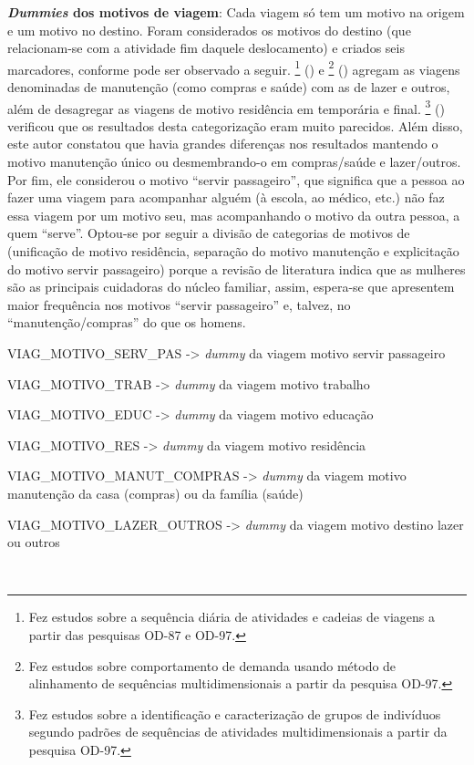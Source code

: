 \begin{compactitem}
\item \textbf{\textit{Dummies} dos motivos de viagem}: Cada viagem só tem um motivo na origem e um motivo no destino.
Foram considerados os motivos do destino (que relacionam-se com a atividade fim daquele deslocamento) e criados seis marcadores, conforme pode ser observado a seguir. 
\footnote{Fez estudos sobre a sequência diária de atividades e cadeias de viagens a partir das pesquisas OD-87 e OD-97.} (\citeyear{VESPUCCI2003}) e \footnote{Fez estudos sobre comportamento de demanda usando método de alinhamento de sequências multidimensionais a partir da pesquisa OD-97.} (\citeyear{GERMANI2005}) agregam as viagens denominadas de manutenção  (como compras e saúde) com as de lazer e outros, além de desagregar as viagens de motivo residência em temporária e final. 
\footnote{Fez estudos sobre a identificação e caracterização de grupos de indivíduos segundo padrões de sequências de atividades multidimensionais a partir da pesquisa OD-97.} (\citeyear{DALMASO2009}) verificou que os resultados desta categorização eram muito parecidos.
Além disso, este autor constatou que havia grandes diferenças nos resultados mantendo o motivo manutenção único ou desmembrando-o em compras/saúde e lazer/outros.
Por fim, ele considerou o motivo ``servir passageiro'', que significa que a pessoa ao fazer uma viagem para acompanhar alguém (à escola, ao médico, etc.) não faz essa viagem por um motivo seu, mas acompanhando o motivo da outra pessoa, a quem ``serve''.
Optou-se por seguir a divisão de categorias de motivos de  (unificação de motivo residência, separação do motivo manutenção e explicitação do motivo servir passageiro) porque a revisão de literatura indica que as mulheres são as principais cuidadoras do núcleo familiar, assim, espera-se que apresentem maior frequência nos motivos ``servir passageiro'' e, talvez, no ``manutenção/compras'' do que os homens.
    \begin{compactitem}[]
    \item VIAG_MOTIVO_SERV_PAS -> \textit{dummy} da viagem motivo servir passageiro
    \item VIAG_MOTIVO_TRAB -> \textit{dummy} da viagem motivo trabalho
    \item VIAG_MOTIVO_EDUC -> \textit{dummy} da viagem motivo educação
    \item VIAG_MOTIVO_RES -> \textit{dummy} da viagem motivo residência
    \item VIAG_MOTIVO_MANUT_COMPRAS -> \textit{dummy} da viagem motivo manutenção da casa (compras) ou da família (saúde)
    \item VIAG_MOTIVO_LAZER_OUTROS -> \textit{dummy} da viagem motivo destino lazer ou outros
    \end{compactitem}\


\end{compactitem}
